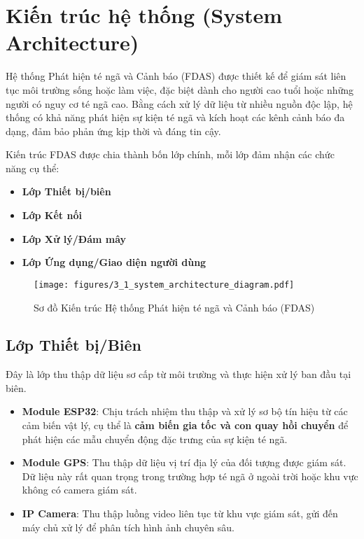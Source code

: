 
\section{Kiến trúc hệ thống (System Architecture)}
\label{sec:system_architecture}

Hệ thống Phát hiện té ngã và Cảnh báo (FDAS) được thiết kế để giám sát liên tục môi trường sống hoặc làm việc, đặc biệt dành cho người cao tuổi hoặc những người có nguy cơ té ngã cao. Bằng cách xử lý dữ liệu từ nhiều nguồn độc lập, hệ thống có khả năng phát hiện sự kiện té ngã và kích hoạt các kênh cảnh báo đa dạng, đảm bảo phản ứng kịp thời và đáng tin cậy.

Kiến trúc FDAS được chia thành bốn lớp chính, mỗi lớp đảm nhận các chức năng cụ thể: 
\begin{itemize}
    \item \textbf{Lớp Thiết bị\slash biên} 
    \item \textbf{Lớp Kết nối}
    \item \textbf{Lớp Xử lý\slash Đám mây}
    \item \textbf{Lớp Ứng dụng\slash Giao diện người dùng}
\end{itemize}

\begin{figure}[H]
    \centering
    \texttt{[image: figures/3\_1\_system\_architecture\_diagram.pdf]}
    \caption{Sơ đồ Kiến trúc Hệ thống Phát hiện té ngã và Cảnh báo (FDAS)}
    \label{fig:system_architecture}
\end{figure}

\subsection{Lớp Thiết bị\slash  Biên}
Đây là lớp thu thập dữ liệu sơ cấp từ môi trường và thực hiện xử lý ban đầu tại biên.
\begin{itemize}
    \item \textbf{Module ESP32}: Chịu trách nhiệm thu thập và xử lý sơ bộ tín hiệu từ các cảm biến vật lý, cụ thể là \textbf{cảm biến gia tốc  và con quay hồi chuyển} để phát hiện các mẫu chuyển động đặc trưng của sự kiện té ngã.
    \item \textbf{Module GPS}: Thu thập dữ liệu vị trí địa lý của đối tượng được giám sát. Dữ liệu này rất quan trọng trong trường hợp té ngã ở ngoài trời hoặc khu vực không có camera giám sát.
    \item \textbf{IP Camera}: Thu thập luồng video liên tục từ khu vực giám sát, gửi đến máy chủ xử lý để phân tích hình ảnh chuyên sâu.
\end{itemize}

